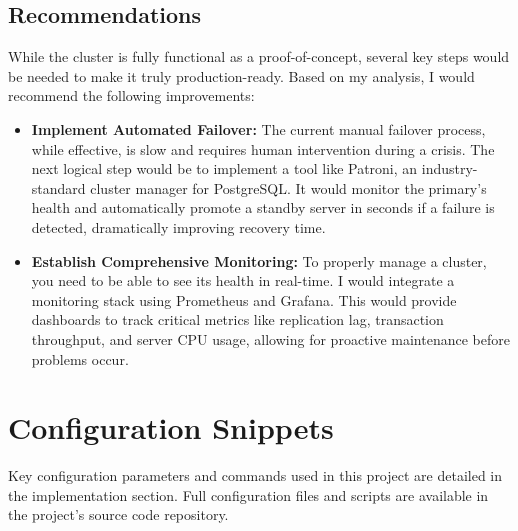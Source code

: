 \documentclass[conference]{IEEEtran}
\begin{document}
\subsection{Recommendations}

While the cluster is fully functional as a proof-of-concept, several key steps would be needed to make it truly production-ready. Based on my analysis, I would recommend the following improvements:

\begin{itemize}
\item \textbf{Implement Automated Failover:} The current manual failover process, while effective, is slow and requires human intervention during a crisis. The next logical step would be to implement a tool like Patroni, an industry-standard cluster manager for PostgreSQL. It would monitor the primary's health and automatically promote a standby server in seconds if a failure is detected, dramatically improving recovery time.

\item \textbf{Establish Comprehensive Monitoring:} To properly manage a cluster, you need to be able to see its health in real-time. I would integrate a monitoring stack using Prometheus and Grafana. This would provide dashboards to track critical metrics like replication lag, transaction throughput, and server CPU usage, allowing for proactive maintenance before problems occur.

\end{itemize}
\appendices

\section{Configuration Snippets}
Key configuration parameters and commands used in this project are detailed in the implementation section. Full configuration files and scripts are available in the project's source code repository.




%
%
%
%
%
%
%
%
%
%
\end{document}
